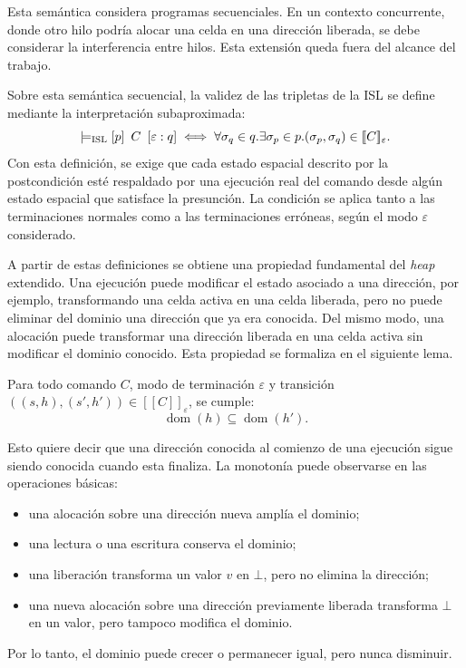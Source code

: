 \documentclass[a4paper,	11pt]{report}
\begin{document}
Esta semántica considera programas secuenciales.
En un contexto concurrente,
donde otro hilo podría alocar una celda en una dirección liberada,
se debe considerar la interferencia entre hilos.
Esta extensión queda fuera del alcance del trabajo.

Sobre esta semántica secuencial,
la validez de las tripletas de la ISL se define mediante la interpretación subaproximada:
$$\models_\mathrm{ISL} \left\lbrack p \right\rbrack~C~\left\lbrack \varepsilon : q \right\rbrack \iff
\forall \sigma_q \in q. \exists \sigma_p \in p. (\sigma_p, \sigma_q) \in [\![C]\!]_\varepsilon.$$
Con esta definición,
se exige que cada estado espacial descrito por la postcondición esté respaldado por una ejecución real del comando
desde algún estado espacial que satisface la presunción.
La condición se aplica tanto a las terminaciones normales como a las terminaciones erróneas,
según el modo $\varepsilon$ considerado.

A partir de estas definiciones se obtiene una propiedad fundamental del \emph{heap} extendido.
Una ejecución puede modificar el estado asociado a una dirección,
por ejemplo,
transformando una celda activa en una celda liberada,
pero no puede eliminar del dominio una dirección que ya era conocida.
Del mismo modo,
una alocación puede transformar una dirección liberada en una celda activa sin modificar el dominio conocido.
Esta propiedad se formaliza en el siguiente lema.

\begin{lema}
\label{lem:monotonia}
Para todo comando $C$,
modo de terminación $\varepsilon$ y transición $((s, h), (s', h')) \in [\![C]\!]_\varepsilon$,
se cumple:
$$\operatorname{dom}(h) \subseteq \operatorname{dom}(h').$$
\end{lema}

Esto quiere decir que una dirección conocida al comienzo de una ejecución sigue siendo conocida cuando esta finaliza.
La monotonía puede observarse en las operaciones básicas:
\begin{itemize}
  \item una alocación sobre una dirección nueva amplía el dominio;
  \item una lectura o una escritura conserva el dominio;
  \item una liberación transforma un valor $v$ en $\bot$,
  pero no elimina la dirección;
  \item una nueva alocación sobre una dirección previamente liberada transforma $\bot$ en un valor,
  pero tampoco modifica el dominio.
\end{itemize}
Por lo tanto, el dominio puede crecer o permanecer igual,
pero nunca disminuir.
\end{document}
